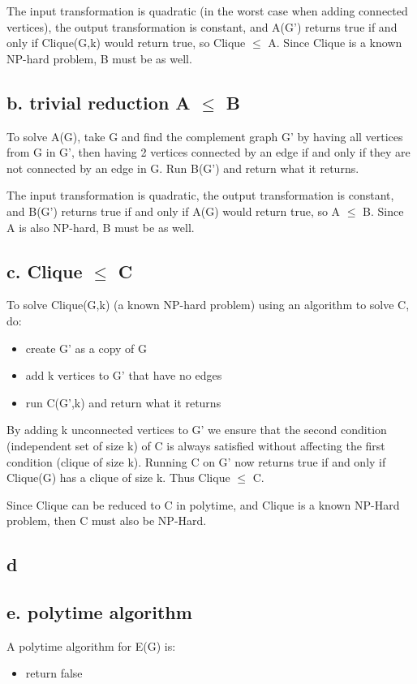 \documentclass[a4paper]{article}
\begin{document}
The input transformation is quadratic (in the worst case when adding connected vertices), the output transformation is constant, and A(G') returns true if and only if Clique(G,k) would return true, so Clique $\leq$ A. Since Clique is a known NP-hard problem, B must be as well.

\subsection{b. trivial reduction A $\leq$ B}
To solve A(G), take G and find the complement graph G' by having all vertices from G in G', then having 2 vertices connected by an edge if and only if they are not connected by an edge in G. Run B(G') and return what it returns.

The input transformation is quadratic, the output transformation is constant, and B(G') returns true if and only if A(G) would return true, so A $\leq$ B. Since A is also NP-hard, B must be as well.

\subsection{c. Clique $\leq$ C}
To solve Clique(G,k) (a known NP-hard problem) using an algorithm to solve C, do:

\begin{itemize}
    \item create G' as a copy of G
    \item add k vertices to G' that have no edges
    \item run C(G',k) and return what it returns
\end{itemize}

By adding k unconnected vertices to G' we ensure that the second condition (independent set of size k) of C is always satisfied without affecting the first condition (clique of size k). Running C on G' now returns true if and only if Clique(G) has a clique of size k. Thus Clique $\leq$ C.

Since Clique can be reduced to C in polytime, and Clique is a known NP-Hard problem, then C must also be NP-Hard.

\subsection{d}

\subsection{e. polytime algorithm}
A polytime algorithm for E(G) is:
\begin{itemize}
    \item return false
\end{itemize}
\end{document}
